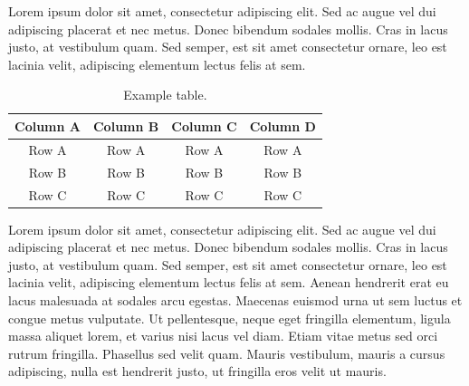Lorem ipsum dolor sit amet, consectetur adipiscing elit. Sed ac augue vel dui 
adipiscing placerat et nec metus. Donec bibendum sodales mollis. Cras in lacus 
justo, at vestibulum quam. Sed semper, est sit amet consectetur ornare, leo est 
lacinia velit, adipiscing elementum lectus felis at sem.

\begin{table}
{\setlength{\tabcolsep}{14pt}
\caption{Example table.}
\begin{center}
\vspace{-6mm}
\begin{tabular}{cccc}
\hline\hline
Column A & Column B & Column C & Column D \\
\hline
Row A & Row A & Row A & Row A \\
Row B & Row B & Row B & Row B \\
Row C & Row C & Row C & Row C \\
\hline
\end{tabular}
\vspace{-6mm}
\end{center}
\label{tableforCh4-1}}
\end{table}

Lorem ipsum dolor sit amet, consectetur adipiscing elit. Sed ac augue vel dui 
adipiscing placerat et nec metus. Donec bibendum sodales mollis. Cras in lacus 
justo, at vestibulum quam. Sed semper, est sit amet consectetur ornare, leo est 
lacinia velit, adipiscing elementum lectus felis at sem. Aenean hendrerit erat eu 
lacus malesuada at sodales arcu egestas. Maecenas euismod urna ut sem luctus et 
congue metus vulputate. Ut pellentesque, neque eget fringilla elementum, ligula 
massa aliquet lorem, et varius nisi lacus vel diam. Etiam vitae metus sed orci 
rutrum fringilla. Phasellus sed velit quam. Mauris vestibulum, mauris a cursus 
adipiscing, nulla est hendrerit justo, ut fringilla eros velit ut mauris.